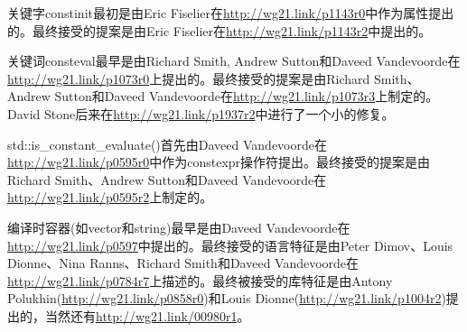 关键字constinit最初是由Eric Fiselier在\url{http://wg21.link/p1143r0}中作为属性提出的。最终接受的提案是由Eric Fiselier在\url{http://wg21.link/p1143r2}中提出的。

关键词consteval最早是由Richard Smith, Andrew Sutton和Daveed Vandevoorde在\url{http://wg21.link/p1073r0}上提出的。最终接受的提案是由Richard Smith、Andrew Sutton和Daveed Vandevoorde在\url{http://wg21.link/p1073r3}上制定的。David Stone后来在\url{http://wg21.link/p1937r2}中进行了一个小的修复。

std::is\_constant\_evaluate()首先由Daveed Vandevoorde在\url{http://wg21.link/p0595r0}中作为constexpr操作符提出。最终接受的提案是由Richard Smith、Andrew Sutton和Daveed Vandevoorde在\url{http://wg21.link/p0595r2}上制定的。

编译时容器(如vector和string)最早是由Daveed Vandevoorde在\url{http://wg21.link/p0597}中提出的。最终接受的语言特征是由Peter Dimov、Louis Dionne、Nina Ranns、Richard Smith和Daveed Vandevoorde在\url{http://wg21.link/p0784r7}上描述的。最终被接受的库特征是由Antony Polukhin(\url{http://wg21.link/p0858r0})和Louis Dionne(\url{http://wg21.link/p1004r2})提出的，当然还有\url{http://wg21.link/00980r1}。